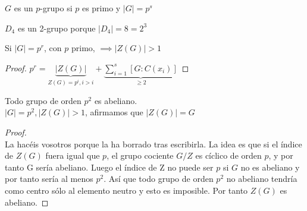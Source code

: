 \documentclass{apuntes}
\begin{document}
\begin{defn}[p-Grupo]
$G$ es un $p$-grupo si $p$ es primo y $|G|=p^s$
\end{defn}

\begin{example}
$D_4$ es un 2-grupo porque $|D_4| = 8 = 2^3$
\end{example}

\corol Si $|G| = p^r$, con $p$ primo, $\implies |Z(G)| > 1$
\begin{proof}
$p^r = \underbrace{|Z(G)|}_{Z(G) = p^i, i>i} + \underbrace{\sum_{i=1}^s[G:C(x_i)]}_{\geq 2}$
\end{proof}

\begin{theorem}
Todo grupo de orden $p^2$ es abeliano.\\
$|G|=p^2, |Z(G)|>1$, afirmamos que $|Z(G)| = G$
\end{theorem}

\begin{proof}\\
La hacéis vosotros porque \href{http://www.uam.es/personal_pdi/ciencias/villa/imagenes/Foto18.jpg}{\color{blue}{Orlando}} la ha borrado tras escribirla.
La idea es que si el índice de $Z(G)$ fuera igual que $p$, el grupo cociente $G/Z$ es cíclico de orden $p$, y por tanto G sería abeliano. Luego el índice de Z no puede ser $p$ si $G$ no es abeliano y por tanto sería al menos $p^2$. Así que todo grupo de orden $p^2$ no abeliano tendría como centro sólo al elemento neutro y esto es imposible. Por tanto $Z(G)$ es abeliano.
\end{proof}
\end{document}
